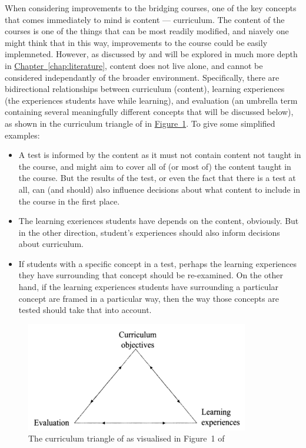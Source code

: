\documentclass[twoside,12pt,a4paper]{report}
\newcommand{\refchap}[1]{\hyperref[chap:#1]{Chapter~\ref{chap:#1}}}
\newcommand{\reffig}[1]{\hyperref[fig:#1]{Figure~\ref{fig:#1}}}
\begin{document}
When considering improvements to the bridging courses, one of the key concepts that comes immediately to mind is content --- curriculum. The content of the courses is one of the things that can be most readily modified, and niavely one might think that in this way, improvements to the course could be easily implemneted. However, as discussed by \cite{Mohandas2003} and will be explored in much more depth in \refchap{literature}, content does not live alone, and cannot be considered independantly of the broader environment. Specifically, there are bidirectional relationships between curriculum (content), learning experiences (the experiences students have while learning), and evaluation (an umbrella term containing several meaningfully different concepts that will be discussed below), as shown in the curriculum triangle of  in \reffig{triangle}. To give some simplified examples: 
\begin{itemize}
	\item A test is informed by the content as it must not contain content not taught in the course, and might aim to cover all of (or most of) the content taught in the course. But the results of the test, or even the fact that there is a test at all, can (and should) also influence decisions about what content to include in the course in the first place.
	\item The learning exeriences students have depends on the content, obviously. But in the other direction, student's experiences should also inform decisions about curriculum. 
	\item If students 
 with a specific concept in a test, perhaps the learning experiences they have surrounding that concept should be re-examined. On the other hand, if the learning experiences students have surrounding a particular concept are framed in a particular way, then the way those concepts are tested should take that into account.
\end{itemize}

\begin{figure}[ht]
\centering
\includegraphics{./figures/curriculum-triangle.PNG}
\caption{The curriculum triangle of \protect{} as visualised in Figure~1 of \protect{}\label{fig:triangle}}
\end{figure}
\end{document}
